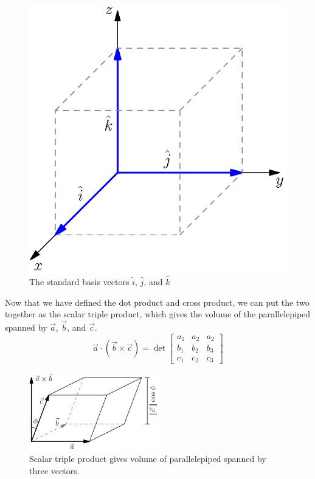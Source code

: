 \begin{figure}[H]
	\centering
	\includegraphics[scale=0.33]{../common/vectorsMatrices/UnitVectors.png}
	\caption{The standard basis vectors $\hat{i}$, $\hat{j}$, and $\hat{k}$}
\end{figure}




\noindent
Now that we have defined the dot product and cross product, we can put the two together as the scalar triple product, which gives the volume of the parallelepiped spanned by $\vec{a}$, $\vec{b}$, and $\vec{c}$.
\begin{equation*}
	\vec{a}\cdot\left(\vec{b}\times\vec{c}\right) = \det\begin{bmatrix}
		a_1 & a_2 & a_2 \\
		b_1 & b_2 & b_3 \\
		c_1 & c_2 & c_3
	\end{bmatrix}
\end{equation*}

\begin{figure}[H]
	\centering
	\includegraphics[width=0.5\textwidth]{../common/vectorsMatrices/Parallelipiped.png}
	\caption{Scalar triple product gives volume of parallelepiped spanned by three vectors.}
\end{figure}
